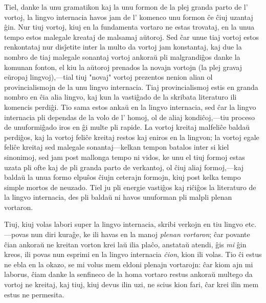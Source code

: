 \documentclass[12pt,twoside]{book}
\begin{document}
Tiel, danke la unu gramatikon kaj la unu formon de la plej granda parto de l' vortoj, la lingvo internacia havos jam de l' komenco unu formon ĉe ĉiuj uzantaj ĝin. Nur tiuj vortoj, kiuj en la fundamenta vortaro ne estas trovataj, en la unua tempo estos malegale kreataj de malsamaj aŭtoroj. Sed ĉar unue tiaj vortoj estos renkontataj nur disĵetite inter la multo da vortoj jam konstantaj, kaj due la nombro de tiaj malegale sonantaj vortoj ankoraŭ pli malgrandiĝos danke la komunan fonton, el kiu la aŭtoroj prenados la novajn vortojn (la plej gravaj eŭropaj lingvoj),—tial tiuj "novaj" vortoj prezentos nenion alian ol provincialismojn de la unu lingvo internacia. Tiaj provincialismoj estis en granda nombro en ĉia alia lingvo, kaj kun la vastiĝado de la skribata literaturo ili komencis perdiĝi. Tio sama estos ankaŭ en la lingvo internacia, sed ĉar la lingvo internacia pli dependas de la volo de l' homoj, ol de aliaj kondiĉoj,—tiu proceso de unuformiĝado iros en ĝi multe pli rapide. La vortoj kreitaj malfeliĉe baldaŭ perdiĝos, kaj la vortoj feliĉe kreitaj restos kaj eniros en la lingvon; la vortoj egale feliĉe kreitaj sed malegale sonantaj—kelkan tempon batalos inter si kiel sinonimoj, sed jam post mallonga tempo ni vidos, ke unu el tiuj formoj estas uzata pli ofte kaj de pli granda parto de verkantoj, ol ĉiuj aliaj formoj,—kaj baldaŭ la unua formo elpuŝos ĉiujn ceterajn formojn, kiuj post kelka tempo simple mortos de neuzado. Tiel ju pli energie vastiĝos kaj riĉiĝos la literaturo de la lingvo internacia, des pli baldaŭ ni havos unuforman pli malpli plenan vortaron.

Tiuj, kiuj volas labori super la lingvo internacia, skribi verkojn en tiu lingvo etc.—povas nun diri kuraĝe, ke ili havas en la manoj \emph{plenan vortaron}; ĉar povante ĉian ankoraŭ ne kreitan vorton krei laŭ ilia plaĉo, anstataŭ atendi, ĝis \emph{mi} ĝin kreos, ili povas nun esprimi en la lingvo internacia \emph{ĉion}, kion ili volas. Tio ĉi estus ne ebla en la okazo, se mi volus mem eldoni plenajn vortarojn: ĉar kiom ajn mi laborus, ĉiam danke la senfineco de la homa vortaro restus ankoraŭ multego da vortoj ne kreitaj, kaj tiuj, kiuj devus ilin uzi, ne scius kion fari, ĉar krei ilin mem estus ne permesita.
\end{document}
